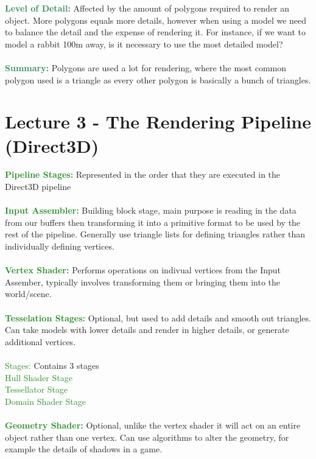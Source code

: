 \documentclass[a4paper,10pt]{article}
\begin{document}
\noindent \textcolor{SeaGreen}{\textbf{Level of Detail:}} Affected by the amount of polygons required to render an object. More polygons equals more details, however when using a model we need to balance the detail and the expense of rendering it. For instance, if we want to model a rabbit 100m away, is it necessary to use the most detailed model? \\ \\
\noindent \textcolor{SeaGreen}{\textbf{Summary:}} Polygons are used a lot for rendering, where the most common polygon used is a triangle as every other polygon is basically a bunch of triangles.  \\ 

\newpage
\section*{Lecture 3 - The Rendering Pipeline (Direct3D)}
\noindent \textcolor{ForestGreen}{\textbf{Pipeline Stages:}} Represented in the order that they are executed in the Direct3D pipeline  \\\\
\noindent \textcolor{ForestGreen}{\textbf{Input Assembler:}} Building block stage, main purpose is reading in the data from our buffers then transforming it into a primitive format to be used by the rest of the pipeline. Generally use triangle lists for defining triangles rather than individually defining vertices.\\\\
\noindent \textcolor{ForestGreen}{\textbf{Vertex Shader:}} Performs operations on indivual vertices from the Input Assember, typically involves transforming them or bringing them into the world/scene.  \\\\
\noindent \textcolor{ForestGreen}{\textbf{Tesselation Stages:}} Optional, but used to add details and smooth out triangles. Can take models with lower details and render in higher details, or generate additional vertices. \\\\
\indent \textcolor{ForestGreen}{Stages:} Contains 3 stages\\
\indent \textcolor{ForestGreen}{Hull Shader Stage} \\
\indent \textcolor{ForestGreen}{Tessellator Stage} \\
\indent \textcolor{ForestGreen}{Domain Shader Stage} \\ \\
\noindent \textcolor{ForestGreen}{\textbf{Geometry Shader:}} Optional, unlike the vertex shader it will act on an entire object rather than one vertex. Can use algorithms to alter the geometry, for example the details of shadows in a game. \\\\
\end{document}
